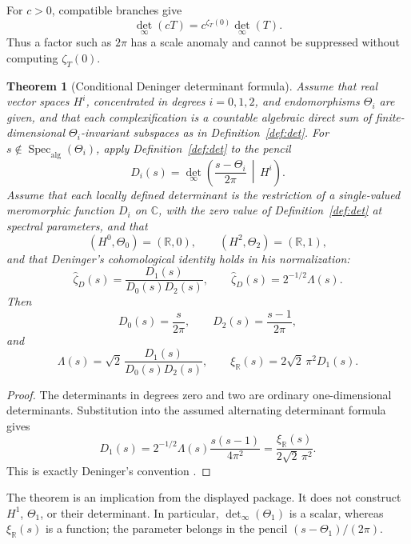 \documentclass[11pt]{article}
\theoremstyle{plain}
\newtheorem{theorem}{Theorem}[section]
\theoremstyle{definition}
\theoremstyle{remark}
\begin{document}
For \(c>0\), compatible branches give
\[
 \det_\infty(cT)=c^{\zeta_T(0)}\det_\infty(T).
\]
Thus a factor such as \(2\pi\) has a scale anomaly and cannot be suppressed
without computing \(\zeta_T(0)\).

\begin{theorem}[Conditional Deninger determinant formula]
\label{thm:deninger}
Assume that real vector spaces \(H^i\), concentrated in degrees
\(i=0,1,2\), and endomorphisms \(\Theta_i\) are given, and that each
complexification is a countable algebraic direct sum of finite-dimensional
\(\Theta_i\)-invariant subspaces as in Definition~\ref{def:det}.  For
\(s\notin\operatorname{Spec}_{\mathrm{alg}}(\Theta_i)\), apply
Definition~\ref{def:det} to the pencil
\[
 D_i(s)=\det_\infty\left(
 \frac{s-\Theta_i}{2\pi}\,\middle|\,H^i\right).
\]
Assume that each locally defined determinant is the restriction of a
single-valued meromorphic function \(D_i\) on \(\mathbb C\), with the zero
value of Definition~\ref{def:det} at spectral parameters, and that
\[
 (H^0,\Theta_0)=(\mathbb R,0),
 \qquad (H^2,\Theta_2)=(\mathbb R,1),
\]
and that Deninger's cohomological identity holds in his normalization:
\[
 \widehat\zeta_D(s)=\frac{D_1(s)}{D_0(s)D_2(s)},
 \qquad \widehat\zeta_D(s)=2^{-1/2}\Lambda(s).
\]
Then
\[
 D_0(s)=\frac{s}{2\pi},\qquad
 D_2(s)=\frac{s-1}{2\pi},
\]
and
\[
 \Lambda(s)=\sqrt2\,\frac{D_1(s)}{D_0(s)D_2(s)},
 \qquad
 \xi_{\mathbb R}(s)=2\sqrt2\,\pi^2D_1(s).
\]
\end{theorem}

\begin{proof}
The determinants in degrees zero and two are ordinary one-dimensional
determinants.  Substitution into the assumed alternating determinant formula
gives
\[
 D_1(s)=2^{-1/2}\Lambda(s)\frac{s(s-1)}{4\pi^2}
 =\frac{\xi_{\mathbb R}(s)}{2\sqrt2\,\pi^2}.
\]
This is exactly Deninger's convention
\cite[\S3, equation~(3)]{Deninger1998}.
\end{proof}

The theorem is an implication from the displayed package.  It does not
construct \(H^1\), \(\Theta_1\), or their determinant.  In particular,
\(\det_\infty(\Theta_1)\) is a scalar, whereas
\(\xi_{\mathbb R}(s)\) is a function; the parameter belongs in the pencil
\((s-\Theta_1)/(2\pi)\).
\end{document}
